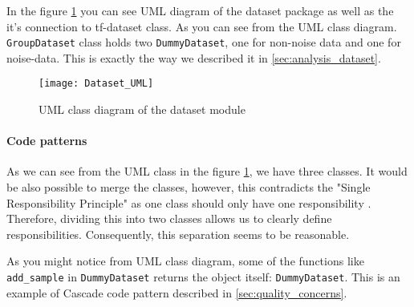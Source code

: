 In the figure \ref{fig:dataset_uml} you can see UML diagram of the dataset package
as well as the it's connection to tf-dataset class. As you can see from the UML
class diagram.
\lstinline{GroupDataset} class holds two \lstinline{DummyDataset}, one for
non-noise data and one for noise-data. This is exactly the way
we described it in \autoref{sec:analysis_dataset}.
\begin{figure}
	\texttt{[image: Dataset\_UML]}
	\caption{UML class diagram of the dataset module}
	\label{fig:dataset_uml}
\end{figure}

\paragraph{Code patterns} As we can see from the UML class in the figure
\ref{fig:dataset_uml}, we have three classes. It would be also possible
to merge the classes, however, this contradicts the "Single Responsibility Principle"
as one class should only have one responsibility \cite{martin2003agile}.
Therefore, dividing this into two classes allows us to clearly
define responsibilities. Consequently, this separation seems to be reasonable.

As you might notice from UML class diagram, some of the functions like
\lstinline{add_sample} in \lstinline{DummyDataset} returns the object itself: \lstinline{DummyDataset}.
This is an example of Cascade code pattern described in \autoref{sec:quality_concerns}.

%

%
%
%
%
%

%

